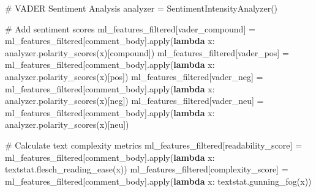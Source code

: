 \documentclass[
  12pt,
  letterpaper,
  DIV=11,
  numbers=noendperiod]{scrartcl}
\newenvironment{Shaded}{\begin{snugshade}}{\end{snugshade}}
\newcommand{\BuiltInTok}[1]{\textcolor[rgb]{0.00,0.23,0.31}{#1}}
\newcommand{\CommentTok}[1]{\textcolor[rgb]{0.37,0.37,0.37}{#1}}
\newcommand{\KeywordTok}[1]{\textcolor[rgb]{0.00,0.23,0.31}{\textbf{#1}}}
\newcommand{\NormalTok}[1]{\textcolor[rgb]{0.00,0.23,0.31}{#1}}
\newcommand{\OperatorTok}[1]{\textcolor[rgb]{0.37,0.37,0.37}{#1}}
\newcommand{\StringTok}[1]{\textcolor[rgb]{0.13,0.47,0.30}{#1}}
\begin{document}
\begin{Shaded}
\begin{Highlighting}[]
\CommentTok{\# VADER Sentiment Analysis}
\NormalTok{analyzer }\OperatorTok{=}\NormalTok{ SentimentIntensityAnalyzer()}

\CommentTok{\# Add sentiment scores}
\NormalTok{ml\_features\_filtered[}\StringTok{\textquotesingle{}vader\_compound\textquotesingle{}}\NormalTok{] }\OperatorTok{=}\NormalTok{ ml\_features\_filtered[}\StringTok{\textquotesingle{}comment\_body\textquotesingle{}}\NormalTok{].}\BuiltInTok{apply}\NormalTok{(}\KeywordTok{lambda}\NormalTok{ x: analyzer.polarity\_scores(x)[}\StringTok{\textquotesingle{}compound\textquotesingle{}}\NormalTok{])}
\NormalTok{ml\_features\_filtered[}\StringTok{\textquotesingle{}vader\_pos\textquotesingle{}}\NormalTok{] }\OperatorTok{=}\NormalTok{ ml\_features\_filtered[}\StringTok{\textquotesingle{}comment\_body\textquotesingle{}}\NormalTok{].}\BuiltInTok{apply}\NormalTok{(}\KeywordTok{lambda}\NormalTok{ x: analyzer.polarity\_scores(x)[}\StringTok{\textquotesingle{}pos\textquotesingle{}}\NormalTok{])}
\NormalTok{ml\_features\_filtered[}\StringTok{\textquotesingle{}vader\_neg\textquotesingle{}}\NormalTok{] }\OperatorTok{=}\NormalTok{ ml\_features\_filtered[}\StringTok{\textquotesingle{}comment\_body\textquotesingle{}}\NormalTok{].}\BuiltInTok{apply}\NormalTok{(}\KeywordTok{lambda}\NormalTok{ x: analyzer.polarity\_scores(x)[}\StringTok{\textquotesingle{}neg\textquotesingle{}}\NormalTok{])}
\NormalTok{ml\_features\_filtered[}\StringTok{\textquotesingle{}vader\_neu\textquotesingle{}}\NormalTok{] }\OperatorTok{=}\NormalTok{ ml\_features\_filtered[}\StringTok{\textquotesingle{}comment\_body\textquotesingle{}}\NormalTok{].}\BuiltInTok{apply}\NormalTok{(}\KeywordTok{lambda}\NormalTok{ x: analyzer.polarity\_scores(x)[}\StringTok{\textquotesingle{}neu\textquotesingle{}}\NormalTok{])}

\CommentTok{\# Calculate text complexity metrics}
\NormalTok{ml\_features\_filtered[}\StringTok{\textquotesingle{}readability\_score\textquotesingle{}}\NormalTok{] }\OperatorTok{=}\NormalTok{ ml\_features\_filtered[}\StringTok{\textquotesingle{}comment\_body\textquotesingle{}}\NormalTok{].}\BuiltInTok{apply}\NormalTok{(}\KeywordTok{lambda}\NormalTok{ x: textstat.flesch\_reading\_ease(x))}
\NormalTok{ml\_features\_filtered[}\StringTok{\textquotesingle{}complexity\_score\textquotesingle{}}\NormalTok{] }\OperatorTok{=}\NormalTok{ ml\_features\_filtered[}\StringTok{\textquotesingle{}comment\_body\textquotesingle{}}\NormalTok{].}\BuiltInTok{apply}\NormalTok{(}\KeywordTok{lambda}\NormalTok{ x: textstat.gunning\_fog(x))}


\end{Highlighting}
\end{Shaded}
\end{document}

